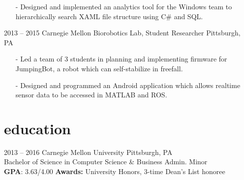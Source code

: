 \documentclass[print]{template/friggeri-cv}
\begin{document}
\begin{entrylist}
{\begin{itemize}[leftmargin=*,itemsep=4pt]
                \item[-] Designed and implemented an analytics tool for the Windows team to hierarchically search XAML file structure using C\# and SQL.
             \end{itemize}}
        \entry
            {2013 -- 2015}
            {Carnegie Mellon Biorobotics Lab, {\normalfont Student Researcher}}
            {Pittsburgh, PA}
            {\begin{itemize}[leftmargin=*,itemsep=4pt]
                \item[-] Led a team of 3 students in planning and implementing firmware for JumpingBot, a robot which can self-stabilize in freefall.
                \item[-] Designed and programmed an Android application which allows realtime sensor data to be accessed in MATLAB and ROS.
            \end{itemize}}
    \end{entrylist}

    \section{education}

    \begin{entrylist}
        \entry
            {2013 -- 2016}
            {Carnegie Mellon University}
            {Pittsburgh, PA}
            {\\ Bachelor of Science in Computer Science \& Business Admin. Minor \\
            \textbf{GPA}: 3.63/4.00 \quad \textbf{Awards:} University Honors, 3-time Dean's List honoree}
    \end{entrylist}
\end{document}
